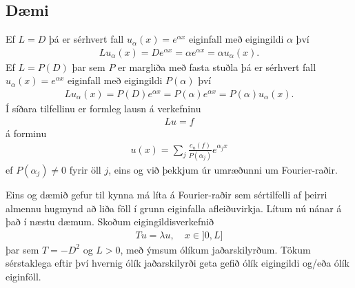 \documentclass[a4paper,10pt,icelandic]{sphinxmanual}
\begin{document}
\subsection{Dæmi}
\label{\detokenize{Kafli03:daemi}}
Ef \(L = D\) þá er sérhvert fall \(u_\alpha(x) = e^{\alpha x}\) eiginfall með eigingildi \(\alpha\) því
\begin{equation*}
\begin{split}L u_\alpha(x) = D e^{\alpha x} = \alpha e^{\alpha x} = \alpha u_\alpha(x).\end{split}
\end{equation*}
Ef \(L = P(D)\) þar sem \(P\) er margliða með fasta stuðla þá er sérhvert fall \(u_\alpha(x)=e^{\alpha x}\) eiginfall með eigingildi \(P(\alpha)\) því
\begin{equation*}
\begin{split}L u_\alpha(x) = P(D) e^{\alpha x} = P(\alpha) e^{\alpha x} = P(\alpha) u_\alpha(x).\end{split}
\end{equation*}
Í síðara tilfellinu er formleg lausn á verkefninu
\begin{equation*}
\begin{split}Lu = f\end{split}
\end{equation*}
á forminu
\begin{equation*}
\begin{split}u(x) = \sum_{j} \frac{c_n(f)}{P(\alpha_j)}e^{\alpha_j x}\end{split}
\end{equation*}
ef \(P(\alpha_j) \neq 0\) fyrir öll \(j\), eins og við þekkjum úr umræðunni um Fourier-raðir.

\begin{DUlineblock}{0em}
\item[] 
\item[] 
\end{DUlineblock}

Eins og dæmið gefur til kynna má líta á Fourier-raðir sem sértilfelli af þeirri almennu hugmynd að liða föll í grunn eiginfalla afleiðuvirkja. Lítum nú nánar á það í næstu dæmum. Skoðum eigingildisverkefnið
\begin{equation*}
\begin{split}Tu = \lambda u, \quad x\in ]0,L]\end{split}
\end{equation*}
þar sem \(T = -D^2\) og \(L>0\), með ýmsum ólíkum jaðarskilyrðum. Tökum sérstaklega eftir því hvernig ólík jaðarskilyrði geta gefið ólík eigingildi og/eða ólík eiginföll.
\end{document}
